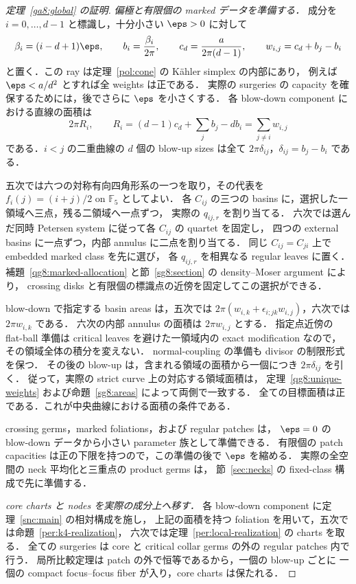 \begin{proof}[定理~\ref{ga8:global} の証明]
\textit{偏極と有限個の marked データを準備する．}
成分を $i=0,\ldots,d-1$ と標識し，十分小さい $\eps>0$ に対して
\[
 \beta_i=(i-d+1)\eps,\qquad
 b_i=\frac{\beta_i}{2\pi},\qquad
 c_d=\frac{a}{2\pi(d-1)},\qquad
 w_{i,j}=c_d+b_j-b_i
\]
と置く．この ray は定理~\ref{pol:cone} の K\"ahler simplex の内部にあり，
例えば $\eps<a/d^2$ とすれば全 weights は正である．
実際の surgeries の capacity を確保するためには，後でさらに $\eps$ を小さくする．
各 blow-down component における直線の面積は
\[
 2\pi R_i,\qquad
 R_i=(d-1)c_d+\sum_jb_j-db_i
     =\sum_{j\ne i}w_{i,j}
\]
である．$i<j$ の二重曲線の $d$ 個の blow-up sizes は全て
$2\pi\delta_{ij}$，$\delta_{ij}=b_j-b_i$ である．

五次では六つの対称有向四角形系の一つを取り，その代表を
$f_i(j)=(i+j)/2$ on $\mathbb F_5$ としてよい．
各 $C_{ij}$ の三つの basins に，選択した一領域へ三点，残る二領域へ一点ずつ，
実際の $q_{ij,r}$ を割り当てる．
六次では選んだ同時 Petersen system に従って各 $C_{ij}$ の quartet を固定し，
四つの external basins に一点ずつ，内部 annulus に二点を割り当てる．
同じ $C_{ij}=C_{ji}$ 上で embedded marked class を先に選び，
各 $q_{ij,r}$ を相異なる regular leaves に置く．
補題~\ref{qg8:marked-allocation} と節~\ref{sg8:section} の density--Moser argument により，
crossing disks と有限個の標識点の近傍を固定してこの選択ができる．

blow-down で指定する basin areas は，五次では
$2\pi(w_{i,k}+\epsilon_{i;jk}w_{i,j})$，六次では $2\pi w_{i,k}$ である．
六次の内部 annulus の面積は $2\pi w_{i,j}$ とする．
指定点近傍の flat-ball 準備は critical leaves を避けた一領域内の exact modification なので，
その領域全体の積分を変えない．
normal-coupling の準備も divisor の制限形式を保つ．
その後の blow-up は，含まれる領域の面積から一個につき $2\pi\delta_{ij}$ を引く．
従って，実際の strict curve 上の対応する領域面積は，
定理~\ref{qg8:unique-weights} および命題~\ref{sg8:areas} によって両側で一致する．
全ての目標面積は正である．これが中央曲線における面積の条件である．

crossing germs，marked foliations，および regular patches は，
$\eps=0$ の blow-down データから小さい parameter 族として準備できる．
有限個の patch capacities は正の下限を持つので，この準備の後で $\eps$ を縮める．
実際の全空間の neck 平均化と三重点の product germs は，
節~\ref{sec:necks} の fixed-class 構成で先に準備する．

\textit{core charts と nodes を実際の成分上へ移す．}
各 blow-down component に定理~\ref{snc:main} の相対構成を施し，
上記の面積を持つ foliation を用いて，五次では命題~\ref{per:k4-realization}，
六次では定理~\ref{per:local-realization} の charts を取る．
全ての surgeries は core と critical collar germs の外の regular patches 内で行う．
局所比較定理は patch の外で恒等であるから，一個の blow-up ごとに
一個の compact focus--focus fiber が入り，core charts は保たれる．


\end{proof}
